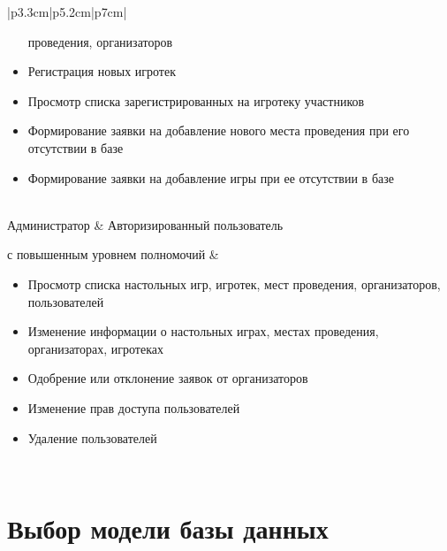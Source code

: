 \begin{table}[h!]
\begin{center}
\begin{threeparttable}
\begin{tabular}{|p{3.3cm}|p{5.2cm}|p{7cm}|}
\begin{minipage}[t]{\linewidth}
\begin{itemize}[nosep,after=\strut]
                        проведения, организаторов\
                          \item Регистрация новых игротек
                          \item Просмотр списка зарегистрированных на игротеку
                        участников
                          \item Формирование заявки на добавление нового места
                        проведения при его отсутствии в базе
                          \item Формирование заявки на добавление игры при ее
                        отсутствии в базе
                      \end{itemize}
                  \end{minipage}\\
            \hline
            Администратор & Авторизированный пользователь\par
                            с повышенным уровнем полномочий
                  & \begin{minipage}[t]{\linewidth}
                      \begin{itemize}[nosep,after=\strut]
                          \item Просмотр списка настольных игр, игротек, мест
                        проведения, организаторов, пользователей
                          \item Изменение информации о настольных играх, местах
                        проведения, организаторах, игротеках
                          \item Одобрение или отклонение заявок от
                        организаторов
                          \item Изменение прав доступа пользователей
                          \item Удаление пользователей
                      \end{itemize}
                  \end{minipage}\\
            \hline
        \end{tabular}
    \end{threeparttable}
    \end{center}
\end{table} 


\section{Выбор модели базы данных}

